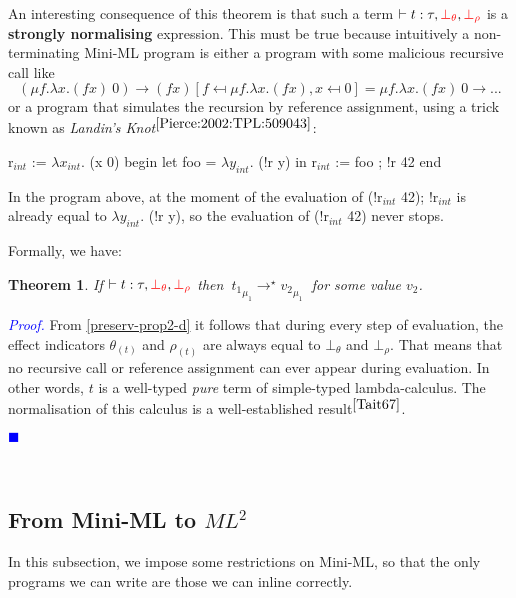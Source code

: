 \documentclass[a4paper,11pt,oneside]{article}
\theoremstyle{plain}
\newtheorem{theorem}[definition]{Theorem}
\renewenvironment{proof}{\noindent \begin{adjustwidth}{1.5em}{} \textcolor{blue}{\textit{Proof.}}}
{{\begin{tiny}\textcolor{blue}{$\blacksquare$}\end{tiny}}
\end{adjustwidth}~\\\noindent}
\newcommand{\bth}{\bot_\theta}
\newcommand{\brh}{\bot_\rho}
\newcommand{\evalstar}[4]{~#1_{\mu_#2} \rightarrow^{\star} #3_{\mu_#4} ~}
\begin{document}
	An interesting consequence of this theorem is that such a term $\vdash t : \tau, \textcolor{red}{\bth}, \textcolor{red}{\brh}$ is a \textbf{strongly normalising} expression. 
	This must be true because intuitively a non-terminating Mini-ML program is either a program with some malicious recursive call like 
$$ (\mu f. \lambda x. (f x)~0) \rightarrow (f x) [ f \mapsfrom \mu f. \lambda x. (f x), x \mapsfrom 0] = \mu f. \lambda x. (f x)~0 \rightarrow ... $$ 
or a program that simulates the recursion by reference assignment, using a trick known as \textit{Landin's Knot}{\footnotesize$^{\cite{Pierce:2002:TPL:509043}}$}:
\begin{whycode} 
 $\text{r}_{int}$ := $\lambda x_{int}. $ (x 0) 
 begin
   let foo = $\lambda y_{int}$. (!r y)  in 
   $\text{r}_{int}$ := foo ; !r 42 
 end \end{whycode}
In the program above, at the moment of the evaluation of (!r$_{int}$ 42); !r$_{int}$ is already equal to $\lambda y_{int}.$ (!r y), so the evaluation of (!r$_{int}$ 42) never stops. 

Formally, we have:
\hypertarget{term-il}{}
\begin{theorem}
 If $\vdash t : \tau, \textcolor{red}{\bth}, \textcolor{red}{\brh}$ then  $\evalstar{t{_1}}{1}{v{_2}}{1}$ for some value $v_2$.
\end{theorem}
\begin{proof}
  From \cref{preserv-prop2-d} it follows that during every step of evaluation, the effect indicators $\theta_{(t)}$ and $\rho_{(t)}$ are always equal to $\bth$ and $\brh$. 
  That means that no recursive call or reference assignment can ever appear during evaluation.
  In other words, $t$ is a  well-typed \textit{pure} term of simple-typed lambda-calculus. 
 	The normalisation of this calculus is a well-established 
  result{\footnotesize$^{\cite{Tait67}}$}. 
\end{proof}

\subsection{From Mini-ML to \texorpdfstring{$ML^2$}{$ML^2$}}


	In this subsection, we impose some restrictions  on Mini-ML, so that the only programs we can write are those we can inline correctly.  
\end{document}
